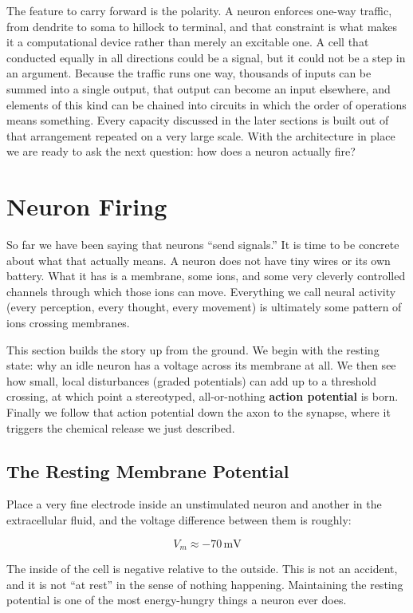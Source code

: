 \documentclass[11pt]{article}
\begin{document}
The feature to carry forward is the polarity. A neuron enforces one-way traffic, from dendrite to soma to hillock to terminal, and that constraint is what makes it a computational device rather than merely an excitable one. A cell that conducted equally in all directions could be a signal, but it could not be a step in an argument. Because the traffic runs one way, thousands of inputs can be summed into a single output, that output can become an input elsewhere, and elements of this kind can be chained into circuits in which the order of operations means something. Every capacity discussed in the later sections is built out of that arrangement repeated on a very large scale. With the architecture in place we are ready to ask the next question: how does a neuron actually fire?


\section{Neuron Firing}

So far we have been saying that neurons ``send signals.'' It is time to be concrete about what that actually means. A neuron does not have tiny wires or its own battery. What it has is a membrane, some ions, and some very cleverly controlled channels through which those ions can move. Everything we call neural activity (every perception, every thought, every movement) is ultimately some pattern of ions crossing membranes.

This section builds the story up from the ground. We begin with the resting state: why an idle neuron has a voltage across its membrane at all. We then see how small, local disturbances (graded potentials) can add up to a threshold crossing, at which point a stereotyped, all-or-nothing \textbf{action potential} is born. Finally we follow that action potential down the axon to the synapse, where it triggers the chemical release we just described.

\subsection{The Resting Membrane Potential}

Place a very fine electrode inside an unstimulated neuron and another in the extracellular fluid, and the voltage difference between them is roughly:

\[
V_m \approx -70 \, \text{mV}
\]

The inside of the cell is negative relative to the outside. This is not an accident, and it is not ``at rest'' in the sense of nothing happening. Maintaining the resting potential is one of the most energy-hungry things a neuron ever does.
\end{document}
